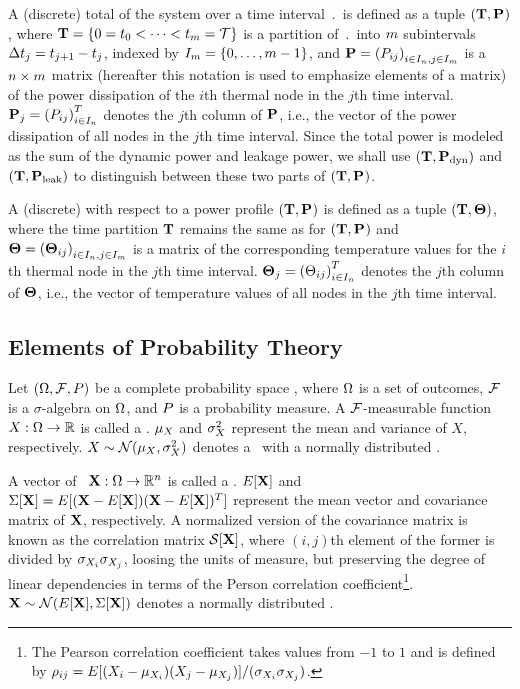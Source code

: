 A (discrete) total  of the system over a time interval $\period$ is defined as a tuple $(\mathbf{T}, \mathbf{P}_{})$, where $\mathbf{T} = \{ 0 = t_0 < \dots < t_{m} = \mathcal{T} \}$ is a partition of $\period$ into $m$ subintervals $\Delta t_j = t_{j+1} - t_j$, indexed by $I_m = \{ 0, \dots, m - 1 \}$, and $\mathbf{P} = \left(P_{ij}\right)_{i \in I_n, j \in I_m}$ is a $n \times m$ matrix (hereafter this notation is used to emphasize elements of a matrix) of the power dissipation of the $i$th thermal node in the $j$th time interval. $\mathbf{P}_j = \left(P_{ij}\right)^T_{i \in I_n}$ denotes the $j$th column of $\mathbf{P}$, i.e., the vector of the power dissipation of all nodes in the $j$th time interval. Since the total power is modeled as the sum of the dynamic power and leakage power, we shall use $(\mathbf{T}, \mathbf{P}_{\text{dyn}})$ and $(\mathbf{T}, \mathbf{P}_{\text{leak}})$ to distinguish between these two parts of $(\mathbf{T}, \mathbf{P}_{})$.

A (discrete)  with respect to a power profile $(\mathbf{T}, \mathbf{P}_{})$ is defined as a tuple $(\mathbf{T}, \mathbf{\Theta})$, where the time partition $\mathbf{T}$ remains the same as for $(\mathbf{T}, \mathbf{P}_{})$ and $\mathbf{\Theta} = \left(\mathbf{\Theta}_{ij}\right)_{i \in I_n, j \in I_m}$ is a matrix of the corresponding temperature values for the $i$th thermal node in the $j$th time interval. $\mathbf{\Theta}_j = \left(\Theta_{ij}\right)^T_{i \in I_n}$ denotes the $j$th column of $\mathbf{\Theta}$, i.e., the vector of temperature values of all nodes in the $j$th time interval.

\subsection{Elements of Probability Theory} 
Let $(\Omega, \mathcal{F}, P)$ be a complete probability space \cite{durrett2010}, where $\Omega$ is a set of outcomes, $\mathcal{F}$ is a $\sigma$-algebra on $\Omega$, and $P$ is a probability measure. A $\mathcal{F}$-measurable function $X: \Omega \to \mathbb{R}$ is called a . $\mu_{X}$ and $\sigma_{X}^2$ represent the mean and variance of $X$, respectively. $X \sim \mathcal{N}(\mu_{X}, \sigma_{X}^2)$ denotes a \rv\ with a normally distributed \rv.

A vector of \rvs\ $\mathbf{X}: \Omega \to \mathbb{R}^n$ is called a . $E[\mathbf{X}]$ and $\Sigma[\mathbf{X}] = E[(\mathbf{X} - E[\mathbf{X}])(\mathbf{X} - E[\mathbf{X}])^T]$ represent the mean vector and covariance matrix of $\mathbf{X}$, respectively. A normalized version of the covariance matrix is known as the correlation matrix $\mathcal{S}[{\mathbf{X}}]$, where $(i,j)$th element of the former is divided by $\sigma_{X_i} \sigma_{X_j}$, loosing the units of measure, but preserving the degree of linear dependencies in terms of the Person correlation coefficient\footnote{The Pearson correlation coefficient takes values from $-1$ to $1$ and is defined by $\rho_{ij} = E[(X_i - \mu_{X_i})(X_j - \mu_{X_j})]/(\sigma_{X_i}\sigma_{X_j})$.}. $\mathbf{X} \sim \mathcal{N}(E[\mathbf{X}], \Sigma[\mathbf{X}])$ denotes a normally distributed \mrv.

